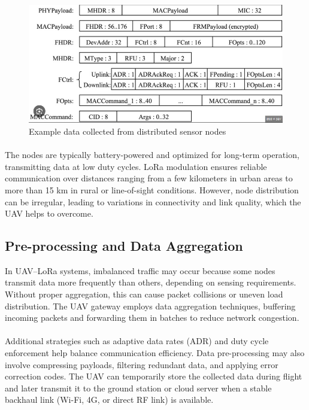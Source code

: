 \begin{figure}[h]
\centering
\includegraphics[width=.9\textwidth,height=.6\textheight]{arch.jpeg}
\caption{Example data collected from distributed sensor nodes} \label{pm}
\end{figure}

\paragraph{}
The nodes are typically battery-powered and optimized for long-term operation, transmitting data at low duty cycles. LoRa modulation ensures reliable communication over distances ranging from a few kilometers in urban areas to more than 15 km in rural or line-of-sight conditions. However, node distribution can be irregular, leading to variations in connectivity and link quality, which the UAV helps to overcome.

\subsection{Pre-processing and Data Aggregation}
In UAV–LoRa systems, imbalanced traffic may occur because some nodes transmit data more frequently than others, depending on sensing requirements. Without proper aggregation, this can cause packet collisions or uneven load distribution. The UAV gateway employs data aggregation techniques, buffering incoming packets and forwarding them in batches to reduce network congestion. 

\paragraph{}
Additional strategies such as adaptive data rates (ADR) and duty cycle enforcement help balance communication efficiency. Data pre-processing may also involve compressing payloads, filtering redundant data, and applying error correction codes. The UAV can temporarily store the collected data during flight and later transmit it to the ground station or cloud server when a stable backhaul link (Wi-Fi, 4G, or direct RF link) is available.

